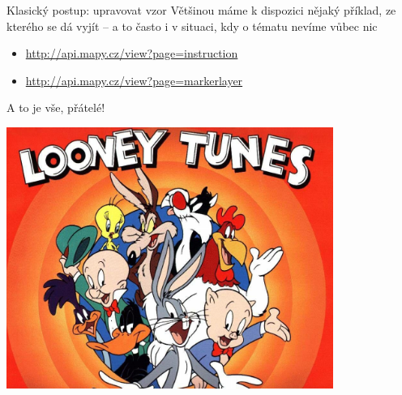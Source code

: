 \documentclass{beamer}
\begin{document}
\begin{frame}{Klasický postup: upravovat vzor}
  Většinou máme k dispozici nějaký příklad, ze kterého se dá vyjít – a to často i v situaci, kdy o tématu nevíme vůbec nic
  \begin{itemize}
    \item {\tiny \url{http://api.mapy.cz/view?page=instruction}}
    \item {\tiny \url{http://api.mapy.cz/view?page=markerlayer}}
  \end{itemize}
\end{frame}

\begin{frame}{A to je vše, přátelé!}
  \begin{center}
    \includegraphics[width=0.8\textwidth]{looney_tunes}
  \end{center}
\end{frame}
\end{document}
